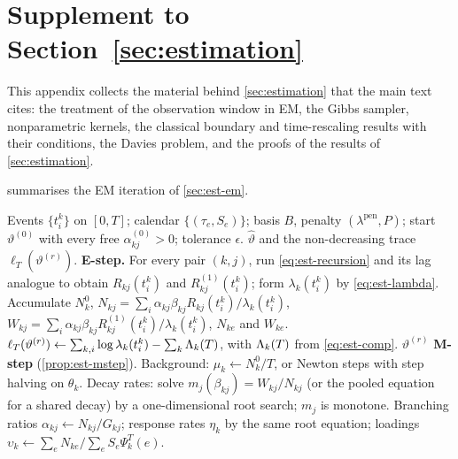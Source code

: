 \section{Supplement to Section~\ref{sec:estimation}}\label{app:est-supp}

This appendix collects the material behind \cref{sec:estimation} that the main text cites:
the treatment of the observation window in EM, the Gibbs sampler, nonparametric kernels,
the classical boundary and time-rescaling results with their conditions, the Davies
problem, and the proofs of the results of \cref{sec:estimation}.

 summarises the EM iteration of \cref{sec:est-em}.

\begin{algorithm}[t]
\caption{EM for the shock-augmented Hawkes model with exponential kernels.}\label{alg:em}
\begin{algorithmic}[1]
\Require Events $\{t^k_i\}$ on $[0,T]$; calendar $\{(\tau_e,S_e)\}$; basis $B$, penalty
  $(\lambda^{\mathrm{pen}},P)$; start $\vartheta^{(0)}$ with every free $\alpha^{(0)}_{kj}>0$;
  tolerance $\epsilon$.
\Ensure $\hat\vartheta$ and the non-decreasing trace $\ell_T(\vartheta^{(r)})$.
  \State \textbf{E-step.} For every pair $(k,j)$, run \eqref{eq:est-recursion} and its lag
    analogue to obtain $R_{kj}(t^k_i)$ and $R^{(1)}_{kj}(t^k_i)$; form $\lambda_k(t^k_i)$ by
    \eqref{eq:est-lambda}.
  \State Accumulate $N^0_k$, $N_{kj}=\sum_i\alpha_{kj}\beta_{kj}R_{kj}(t^k_i)/\lambda_k(t^k_i)$,
    $W_{kj}=\sum_i\alpha_{kj}\beta_{kj}R^{(1)}_{kj}(t^k_i)/\lambda_k(t^k_i)$, $N_{ke}$ and $W_{ke}$.
  \State $\ell_T(\vartheta^{(r)})\gets\sum_{k,i}\log\lambda_k(t^k_i)-\sum_k\Lambda_k(T)$, with
    $\Lambda_k(T)$ from \eqref{eq:est-comp}.
    \State \Return $\vartheta^{(r)}$
  \EndIf
  \State \textbf{M-step} (\cref{prop:est-mstep}). Background: $\mu_k\gets N^0_k/T$, or
    Newton steps with step halving on $\theta_k$.
  \State Decay rates: solve $m_j(\beta_{kj})=W_{kj}/N_{kj}$ (or the pooled equation for a
    shared decay) by a one-dimensional root search; $m_j$ is monotone.
  \State Branching ratios $\alpha_{kj}\gets N_{kj}/G_{kj}$; response rates $\eta_k$ by
    the same root equation; loadings $\upsilon_k\gets\sum_eN_{ke}/\sum_eS_e\Psi^T_k(e)$.
\EndFor
\end{algorithmic}
\end{algorithm}

